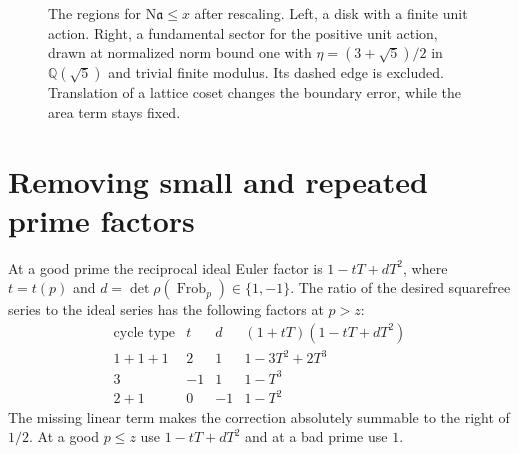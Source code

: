 \documentclass[11pt,a4paper]{article}
\newcommand{\N}{\mathrm N}
\newcommand{\Frob}{\operatorname{Frob}}
\newcommand{\Q}{\mathbb Q}
\begin{document}
\begin{figure}[ht]
\centering
{}
\caption{The regions for $\N\mathfrak a\le x$ after rescaling. Left, a disk with a finite unit action. Right, a fundamental sector for the positive unit action, drawn at normalized norm bound one with $\eta=(3+\sqrt5)/2$ in $\Q(\sqrt5)$ and trivial finite modulus. Its dashed edge is excluded. Translation of a lattice coset changes the boundary error, while the area term stays fixed.}
\end{figure}

\section{Removing small and repeated prime factors}
At a good prime the reciprocal ideal Euler factor is $1-tT+dT^2$, where $t=t(p)$ and $d=\det\rho(\Frob_p)\in\{1,-1\}$. The ratio of the desired squarefree series to the ideal series has the following factors at $p>z$:
\[
\begin{array}{c|r|r|l}
\text{cycle type}&t&d&(1+tT)(1-tT+dT^2)\\ \hline
1+1+1&2&1&1-3T^2+2T^3\\
3&-1&1&1-T^3\\
2+1&0&-1&1-T^2
\end{array}
\]
The missing linear term makes the correction absolutely summable to the right of $1/2$. At a good $p\le z$ use $1-tT+dT^2$ and at a bad prime use $1$.
\end{document}

